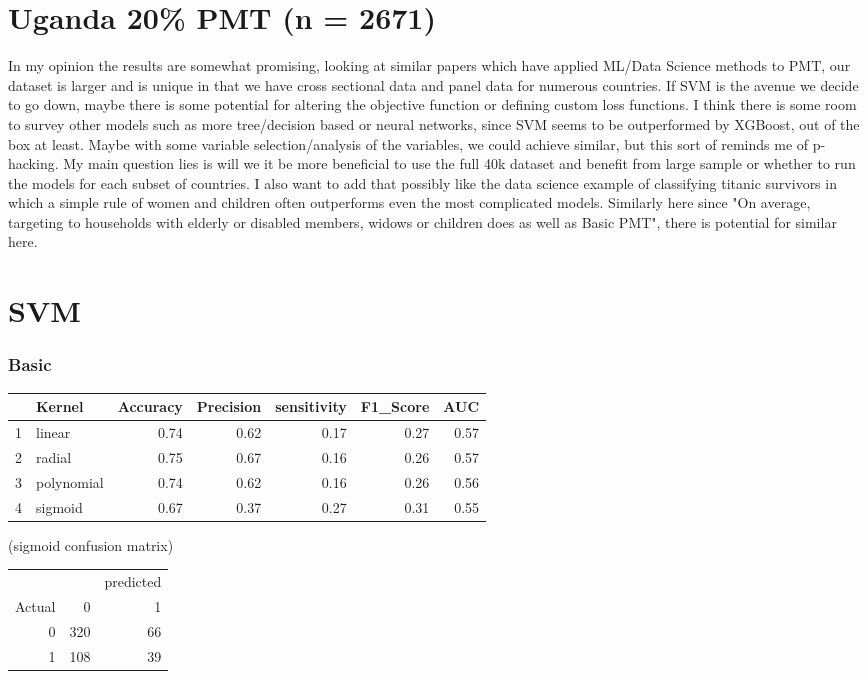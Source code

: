 \documentclass{article}
\begin{document}
\section{Uganda 20\% PMT (n = 2671)}

In my opinion the results are somewhat promising, looking at similar papers which have applied ML/Data Science methods to PMT, our dataset is larger and is unique in that we have cross sectional data and panel data for numerous countries. If SVM is the avenue we decide to go down, maybe there is some potential for altering the objective function or defining custom loss functions. I think there is some room to survey other models such as more tree/decision based or neural networks, since SVM seems to be outperformed by XGBoost, out of the box at least. 
Maybe with some variable selection/analysis of the variables, we could achieve similar, but this sort of reminds me of p-hacking. 
My main question lies is will we it be more beneficial to use the full 40k dataset and benefit from large sample or whether to run the models for each subset of countries. 
I also want to add that possibly like the data science example of classifying titanic survivors in which a simple rule of women and children often outperforms even the most complicated models. Similarly here since "On average, targeting to households with elderly or disabled members, widows or children does as well as Basic PMT", there is potential for similar here. 
\section{SVM}
\subsubsection{Basic}
\begin{table}[ht]
\centering
\begin{tabular}{rlrrrrr}
  \hline
 & Kernel & Accuracy & Precision & sensitivity & F1\_Score & AUC \\ 
  \hline
1 & linear & 0.74 & 0.62 & 0.17 & 0.27 & 0.57 \\ 
  2 & radial & 0.75 & 0.67 & 0.16 & 0.26 & 0.57 \\ 
  3 & polynomial & 0.74 & 0.62 & 0.16 & 0.26 & 0.56 \\ 
  4 & sigmoid & 0.67 & 0.37 & 0.27 & 0.31 & 0.55 \\ 
   \hline
\end{tabular}
\end{table}
(sigmoid confusion matrix)
\begin{table}[ht]
\centering
\begin{tabular}{rrr}
\hline 
& & predicted
  \\Actual
 & 0 & 1 \\ 
  \hline 
0 & 320 &  66 \\ 
  1 & 108 &  39 \\ 
   \hline
\end{tabular}
\end{table}
\end{document}
